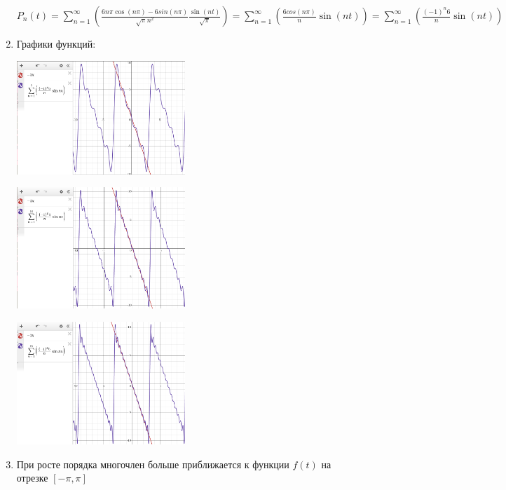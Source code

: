 \begin{enumerate}
    $\displaystyle P_n(t) = \sum^\infty_{n=1} \left(\frac{6n\pi \cos(n\pi) - 6sin(n\pi)}{\sqrt{\pi}n^2} \frac{\sin (nt)}{\sqrt{\pi}}\right) = \sum^\infty_{n=1} \left(\frac{6cos(n\pi)}{n} \sin(nt)\right) = \sum^\infty_{n=1}\left(\frac{(-1)^n 6}{n} \sin(nt)\right)$
    \vspace{5mm}
    \item Графики функций:
    \vspace{5mm}

    \includegraphics[width=0.5\textwidth]{images/1b_a}

    \includegraphics[width=0.5\textwidth]{images/1b_b}

    \includegraphics[width=0.5\textwidth]{images/1b_c}

    \vspace{5mm}
    \item При росте порядка многочлен больше приближается к функции $f(t)$ на отрезке $[-\pi, \pi]$
\end{enumerate}

